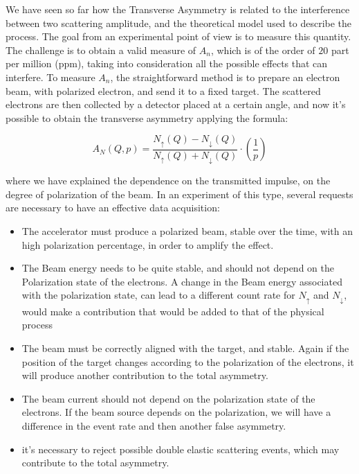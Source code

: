 We have seen so far how the Transverse Asymmetry is related to the interference between two scattering amplitude, and the theoretical model used to describe the process. The goal from an experimental point of view is to measure this quantity. The challenge is to obtain a valid measure of $A_{n}$, which is of the order of $20$ part per million (ppm), taking into consideration all the possible effects that can interfere. To measure $A_{n}$, the straightforward method is to prepare an electron beam, with polarized electron, and send it to a fixed target. The scattered electrons are then collected by a detector placed at a certain angle, and now it's possible to obtain the transverse asymmetry applying the formula:

\begin{equation}
A_{N} (Q,p) = \dfrac{N_{\uparrow}(Q) - N_{\downarrow}(Q)}{N_{\uparrow}(Q) + N_{\downarrow}(Q)} \cdot (\frac{1}{p})   
\end{equation} 

where we have explained the dependence on the transmitted impulse, on the degree of polarization of the beam.
In an experiment of this type, several requests are necessary to have an effective data acquisition:

\begin{itemize}
\item The accelerator must produce a polarized beam, stable over the time, with an high polarization percentage, in order to amplify the effect.
\item The Beam energy needs to be quite stable, and should not depend on the Polarization state of the electrons. A change in the Beam energy associated with the polarization state, can lead to a different count rate for $N_{\uparrow}$ and $N_{\downarrow}$, would make a contribution that would be added to that of the physical process
\item The beam must be correctly aligned with the target, and stable. Again if the position of the target changes according to the polarization of the electrons, it will produce another contribution to the total asymmetry.
\item The beam current should not depend on the polarization state of the electrons. If the beam source depends on the polarization, we will have a difference in the event rate and then another false asymmetry.
\item it's necessary to reject possible double elastic scattering events, which may contribute to the total asymmetry. 
\end{itemize}


